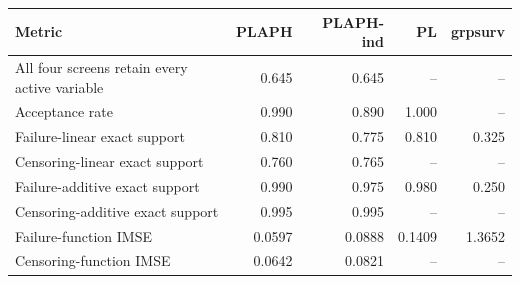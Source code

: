 \begin{table}[!htbp]
\centering

\label{tab:supp-strong-correlation}
\begin{threeparttable}
\small
\setlength{\tabcolsep}{6pt}
\begin{tabular}{lrrrr}
\toprule
Metric & PLAPH & PLAPH-ind & PL & grpsurv \\
\midrule
All four screens retain every active variable & 0.645 & 0.645 & -- & -- \\
Acceptance rate & 0.990 & 0.890 & 1.000 & -- \\
Failure-linear exact support & 0.810 & 0.775 & 0.810 & 0.325 \\
Censoring-linear exact support & 0.760 & 0.765 & -- & -- \\
Failure-additive exact support & 0.990 & 0.975 & 0.980 & 0.250 \\
Censoring-additive exact support & 0.995 & 0.995 & -- & -- \\
Failure-function IMSE & 0.0597 & 0.0888 & 0.1409 & 1.3652 \\
Censoring-function IMSE & 0.0642 & 0.0821 & -- & -- \\
\bottomrule
\end{tabular}
\end{threeparttable}
\end{table}

